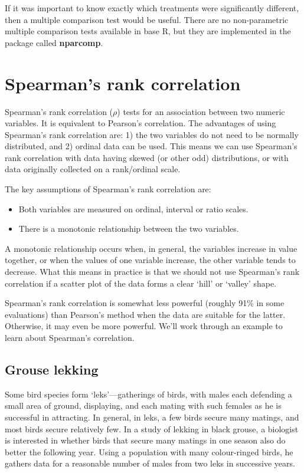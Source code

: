 \documentclass[
]{book}
\begin{document}
If it was important to know exactly which treatments were significantly different, then a multiple comparison test would be useful. There are no non-parametric multiple comparison tests available in base R, but they are implemented in the package called \textbf{nparcomp}.

\hypertarget{spearmans-rank-correlation}{%
\section{Spearman's rank correlation}\label{spearmans-rank-correlation}}

Spearman's rank correlation (\(\rho\)) tests for an association between two numeric variables. It is equivalent to Pearson's correlation. The advantages of using Spearman's rank correlation are: 1) the two variables do not need to be normally distributed, and 2) ordinal data can be used. This means we can use Spearman's rank correlation with data having skewed (or other odd) distributions, or with data originally collected on a rank/ordinal scale.

The key assumptions of Spearman's rank correlation are:

\begin{itemize}
\item
  Both variables are measured on ordinal, interval or ratio scales.
\item
  There is a monotonic relationship between the two variables.
\end{itemize}

A monotonic relationship occurs when, in general, the variables increase in value together, or when the values of one variable increase, the other variable tends to decrease. What this means in practice is that we should not use Spearman's rank correlation if a scatter plot of the data forms a clear `hill' or `valley' shape.

Spearman's rank correlation is somewhat less powerful (roughly 91\% in some evaluations) than Pearson's method when the data are suitable for the latter. Otherwise, it may even be more powerful. We'll work through an example to learn about Spearman's correlation.

\hypertarget{grouse-lekking}{%
\subsection{Grouse lekking}\label{grouse-lekking}}

Some bird species form `leks'---gatherings of birds, with males each defending a small area of ground, displaying, and each mating with such females as he is successful in attracting. In general, in leks, a few birds secure many matings, and most birds secure relatively few. In a study of lekking in black grouse, a biologist is interested in whether birds that secure many matings in one season also do better the following year. Using a population with many colour-ringed birds, he gathers data for a reasonable number of males from two leks in successive years.
\end{document}
